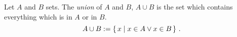 \guard



\begin{defn}
\label{defn:union}
  Let $A$ and $B$ sets.
  The \emph{union} of $A$ and $B$, $A\cup B$ is the set which contains everything which is in $A$ or in $B$.
  \[ A\cup B := \left\{\, x \mid x\in A \vee x\in B\,\right\}\,.\]
\end{defn}
